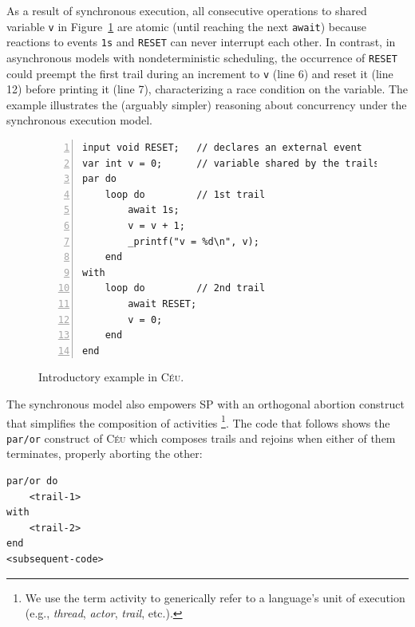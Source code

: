 \documentclass{sigplanconf}
\newcommand{\CEU}{\textsc{C\'{e}u}\xspace}
\newcommand{\code}[1] {{\small{\texttt{#1}}}}
\newcommand{\1}{\;}
\newcommand{\2}{\;\;}
\newcommand{\3}{\;\;\;}
\newcommand{\5}{\;\;\;\;\;}
\begin{document}

As a result of synchronous execution, all consecutive operations to shared 
variable \code{v} in Figure~\ref{lst.intro} are atomic (until reaching the next 
\code{await}) because reactions to events \code{1s} and \code{RESET} can never 
interrupt each other.
%
In contrast, in asynchronous models with nondeterministic scheduling, the 
occurrence of \code{RESET} could preempt the first trail during an increment to 
\code{v} (line 6) and reset it (line 12) before printing it (line 7), 
characterizing a race condition on the variable.
%
The example illustrates the (arguably simpler) reasoning about concurrency 
under the synchronous execution model.

\begin{figure}%
\begin{lstlisting}[numbers=left,xleftmargin=3em]
input void RESET;   // declares an external event
var int v = 0;      // variable shared by the trails
par do
    loop do         // 1st trail
        await 1s;
        v = v + 1;
        _printf("v = %d\n", v);
    end
with
    loop do         // 2nd trail
        await RESET;
        v = 0;
    end
end
\end{lstlisting}
\caption{ Introductory example in \CEU.
\label{lst.intro}
}
\end{figure}


The synchronous model also empowers SP with an orthogonal abortion construct 
that simplifies the composition of activities%
\footnote{We use the term activity to generically refer to a language's unit of 
execution (e.g., \emph{thread}, \emph{actor}, \emph{trail}, etc.).}.
%
%
The code that follows shows the \code{par/or} construct of \CEU which composes 
trails and rejoins when either of them terminates, properly aborting the other:

\begin{lstlisting}
par/or do
    <trail-1>
with
    <trail-2>
end
<subsequent-code>
\end{lstlisting}

\end{document}
